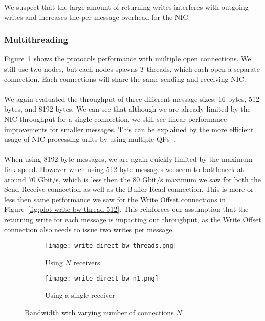 We suspect that the large amount of returning writes interferes with outgoing writes and increases the per message overhead
for the NIC. 
  

\subsubsection{Multithreading}

Figure~\ref{fig:plot-wdir-bw-threads} shows the protocols performance with multiple open connections. We still use two nodes,
but each nodes spawns $T$ threads, which each open a separate connection. Each connections will share the same sending and 
receiving NIC.

\paragraph{} We again evaluated the throughput of three different message sizes: 16 bytes, 512 bytes, and 8192 bytes. We can see that 
although we are already limited by the NIC throughput for a single connection, we still see linear performance improvements 
for smaller messages. This can be explained by the more efficient usage of NIC processing units by using multiple 
QPs~\cite{anuj-guide}.

\paragraph{} When using 8192 byte messages, we are again quickly limited by the maximum link speed. However when using 
512 byte messages we seem to bottleneck at around 70 Gbit/s, which is less then the 80 Gbit/s maximum we saw for both the
Send Receive connection as well as the Buffer Read connection. This is more or less then same performance we saw for the
Write Offset connections in Figure~\ref{fig:plot-write-bw-thread-512}. This reinforces our assumption that the returning write
for each message is impacting our throughput, as the Write Offset connection also needs to issue two writes per message.

\begin{figure}[ht]
  \begin{subfigure}[b]{0.48\textwidth}
  \centering
  \texttt{[image: write-direct-bw-threads.png]}
  \caption{Using $N$ receivers}
  \label{fig:plot-wdir-bw-threads}
  \end{subfigure}
  \begin{subfigure}[b]{0.48\textwidth}
  \centering
  \texttt{[image: write-direct-bw-n1.png]}
  \caption{Using a single receiver}
  \label{fig:plot-wdir-bw-n1}
  \end{subfigure}
  \caption{Bandwidth with varying number of connections $N$}
\end{figure}

